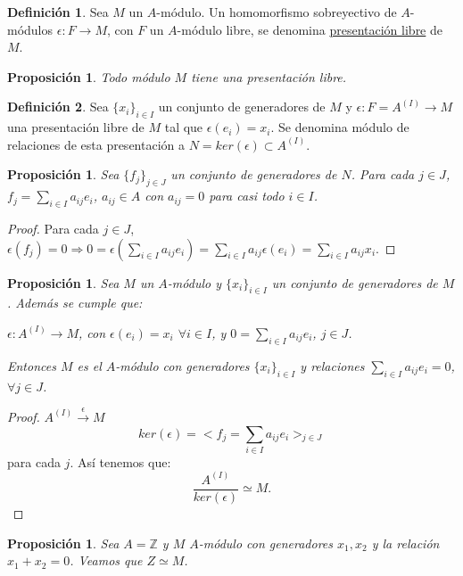 \documentclass{article}
\theoremstyle{theorem-style}  %
\newtheorem{proposition}[theorem]{Proposición}
\theoremstyle{definition}
\newtheorem{definition}{Definición}[section]
\theoremstyle{example-style}
\begin{document}
\begin{definition}
	Sea $M$ un $A$-módulo. Un homomorfismo sobreyectivo de $A$-módulos $\epsilon : F \longrightarrow M$, con $F$ un $A$-módulo libre, se denomina \underline{presentación libre} de $M$. 
\end{definition}
\begin{proposition}
	Todo módulo $M$ tiene una presentación libre.
\end{proposition}
\begin{definition}
	Sea $\{x_i\}_{i\in I}$ un conjunto de generadores de $M$ y $\epsilon : F = A^{(I)} \longrightarrow M$ una presentación libre de $M$ tal que $\epsilon (e_i) = x_i$. Se denomina módulo de relaciones de esta presentación a $N = ker(\epsilon) \subset A^{(I)}$.
\end{definition}
\begin{proposition}
	Sea $\{f_j\}_{j\in J}$ un conjunto de generadores de $N$. Para cada $j\in J$, $f_j = \sum_{i\in I} a_{ij}e_i$, $a_{ij}\in A$ con $a_{ij} = 0$ para casi todo $i\in I$.
\end{proposition}
\begin{proof}
	Para cada $j\in J$, $\epsilon (f_j) = 0 \Rightarrow 0 = \epsilon (\sum_{i\in I} a_{ij}e_i) = \sum_{i\in I} a_{ij} \epsilon (e_i) = \sum_{i\in I} a_{ij} x_i$. 
\end{proof}
\begin{proposition}
	Sea $M$ un $A$-módulo y $\{x_i\}_{i\in I}$ un conjunto de generadores de $M$. Además se cumple que:
	\begin{center}
		$\epsilon : A^{(I)} \longrightarrow M$, con $\epsilon (e_i) = x_i$ $\forall i\in I$, y $0 = \sum_{i\in I} a_{ij}e_i$, $j\in J$.
	\end{center}
	Entonces $M$ es el $A$-módulo con generadores $\{x_i\}_{i\in I}$ y relaciones $\sum_{i\in I} a_{ij}e_i = 0$, $\forall j\in J$.
\end{proposition}
\begin{proof}
	$A^{(I)} \stackrel{\epsilon}{\longrightarrow} M$
	\[ker(\epsilon) = <f_j = \sum_{i\in I} a_{ij}e_i>_{j\in J}\]
	para cada $j$. Así tenemos que:
	\[\frac{A^{(I)}}{ker(\epsilon)}\simeq M.\]
\end{proof}
\begin{proposition}
	Sea $A=\mathbb{Z}$ y $M$ $A$-módulo con generadores $x_1,x_2$ y la relación $x_1+x_2=0$. Veamos que $Z\simeq M$.
\end{proposition}
\end{document}
